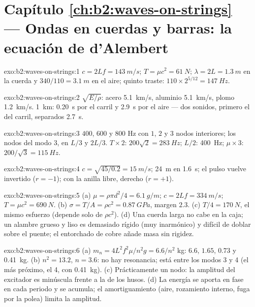 \section*{Capítulo \ref{ch:b2:waves-on-strings} --- Ondas en cuerdas y barras: la ecuación de d'Alembert}

\begin{solution}{exo:b2:waves-on-strings:1}
$c = 2Lf = \qty{143}{m/s}$; $T = \mu c^2 = \qty{61}{N}$; $\lambda = 2L = \qty{1.3}{m}$ en la
cuerda y $340/110 = \qty{3.1}{m}$ en el aire; quinto traste: $110 \times 2^{5/12} =
\qty{147}{Hz}$.
\end{solution}

\begin{solution}{exo:b2:waves-on-strings:2}
$\sqrt{E/\rho}$: acero \qty{5.1}{km/s}, aluminio \qty{5.1}{km/s}, plomo
\qty{1.2}{km/s}. \qty{1}{km}: \qty{0.20}{s} por el carril y \qty{2.9}{s} por el aire ---
dos sonidos, primero el del carril, separados \qty{2.7}{s}.
\end{solution}

\begin{solution}{exo:b2:waves-on-strings:3}
$400$, $600$ y $800$ Hz con $1$, $2$ y $3$ nodos interiores; los nodos del modo 3, en
$L/3$ y $2L/3$. $T \times 2$: $200\sqrt2 = \qty{283}{Hz}$; $L/2$: \qty{400}{Hz}; $\mu
\times 3$: $200/\sqrt3 = \qty{115}{Hz}$.
\end{solution}

\begin{solution}{exo:b2:waves-on-strings:4}
$c = \sqrt{45/0.2} = \qty{15}{m/s}$; \qty{24}{m} en \qty{1.6}{s}; el pulso vuelve
invertido ($r = -1$); con la anilla libre, derecho ($r = +1$).
\end{solution}

\begin{solution}{exo:b2:waves-on-strings:5}
(a) $\mu = \rho\pi d^2/4 = \qty{6.1}{g/m}$; $c = 2Lf = \qty{334}{m/s}$; $T = \mu c^2 =
\qty{690}{N}$. (b) $\sigma = T/A = \rho c^2 = \qty{0.87}{GPa}$, margen $2.3$. (c) $T/4 =
\qty{170}{N}$, el mismo esfuerzo (depende solo de $\rho c^2$). (d) Una cuerda
larga no cabe en la caja; un alambre grueso y liso es demasiado rígido
(muy inarmónico) y difícil de doblar sobre el puente; el entorchado de
cobre añade masa sin rigidez.
\end{solution}

\begin{solution}{exo:b2:waves-on-strings:6}
(a) $m_n = 4L^2f^2\mu/n^2g = 6.6/n^2$ kg: $6.6$, $1.65$, $0.73$ y \qty{0.41}{kg}. (b)
$n^2 = 13.2$, $n = 3.6$: no hay resonancia; está entre los modos 3 y 4 (el más próximo, el 4, con
\qty{0.41}{kg}). (c) Prácticamente un nodo: la amplitud del excitador es
minúscula frente a la de los husos. (d) La energía se aporta en fase en
cada periodo y se acumula; el amortiguamiento (aire, rozamiento interno,
fuga por la polea) limita la amplitud.
\end{solution}

